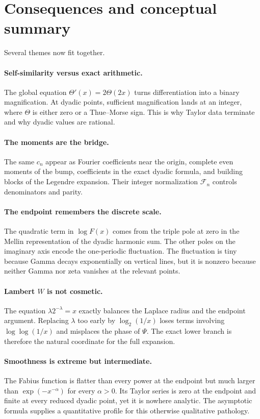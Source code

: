 \documentclass[11pt]{article}
\numberwithin{equation}{section}
\theoremstyle{definition}
\theoremstyle{remark}
\newcommand{\Th}{\Theta}
\begin{document}
\section{Consequences and conceptual summary}\label{sec:consequences}

Several themes now fit together.

\paragraph{Self-similarity versus exact arithmetic.}
The global equation $\Th'(x)=2\Th(2x)$ turns differentiation into a binary
magnification.  At dyadic points, sufficient magnification lands at an
integer, where $\Th$ is either zero or a Thue--Morse sign.  This is why Taylor
data terminate and why dyadic values are rational.

\paragraph{The moments are the bridge.}
The same $c_n$ appear as Fourier coefficients near the origin, complete even
moments of the bump, coefficients in the exact dyadic formula, and building
blocks of the Legendre expansion.  Their integer normalization
$\mathcal F_n$ controls denominators and parity.

\paragraph{The endpoint remembers the discrete scale.}
The quadratic term in $\log F(x)$ comes from the triple pole at zero in the
Mellin representation of the dyadic harmonic sum.  The other poles on the
imaginary axis encode the one-periodic fluctuation.  The fluctuation is tiny
because Gamma decays exponentially on vertical lines, but it is nonzero
because neither Gamma nor zeta vanishes at the relevant points.

\paragraph{Lambert $W$ is not cosmetic.}
The equation $\lambda2^{-\lambda}=x$ exactly balances the Laplace radius and
the endpoint argument.  Replacing $\lambda$ too early by
$\log_2(1/x)$ loses terms involving $\log\log(1/x)$ and misplaces the phase of
$\Psi$.  The exact lower branch is therefore the natural coordinate for the
full expansion.

\paragraph{Smoothness is extreme but intermediate.}
The Fabius function is flatter than every power at the endpoint but much
larger than $\exp(-x^{-\alpha})$ for every $\alpha>0$.  Its Taylor series is
zero at the endpoint and finite at every reduced dyadic point, yet it is
nowhere analytic.  The asymptotic formula supplies a quantitative profile for
this otherwise qualitative pathology.
\end{document}
